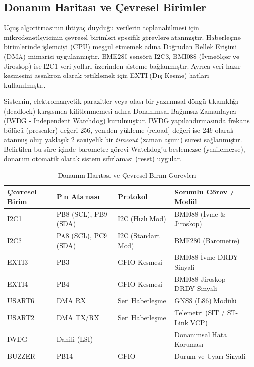 \subsection{Donanım Haritası ve Çevresel Birimler}
\label{donanim_haritasi}

Uçuş algoritmasının ihtiyaç duyduğu verilerin toplanabilmesi için mikrodenetleyicinin çevresel birimleri spesifik görevlere atanmıştır. Haberleşme birimlerinde işlemciyi (CPU) meşgul etmemek adına Doğrudan Bellek Erişimi (DMA) mimarisi uygulanmıştır. BME280 sensörü I2C3, BMI088 (İvmeölçer ve Jiroskop) ise I2C1 veri yolları üzerinden sisteme bağlanmıştır. Ayrıca veri hazır kesmesini asenkron olarak tetiklemek için EXTI (Dış Kesme) hatları kullanılmıştır.

Sistemin, elektromanyetik parazitler veya olası bir yazılımsal döngü tıkanıklığı (deadlock) karşısında kilitlenmemesi adına Donanımsal Bağımsız Zamanlayıcı (IWDG - Independent Watchdog) kurulmuştur. IWDG yapılandırmasında frekans bölücü (prescaler) değeri 256, yeniden yükleme (reload) değeri ise 249 olarak atanmış olup yaklaşık 2 saniyelik bir \textit{timeout} (zaman aşımı) süresi sağlanmıştır. Belirtilen bu süre içinde barometre görevi Watchdog'u beslemezse (yenilemezse), donanım otomatik olarak sistem sıfırlaması (reset) uygular.

\begin{table}[htbp]
    \centering
    \caption{Donanım Haritası ve Çevresel Birim Görevleri}
    \label{tab:donanim_haritasi}
    \begin{tabular}{|l|l|l|l|}
    \hline
    \textbf{Çevresel Birim} & \textbf{Pin Ataması} & \textbf{Protokol} & \textbf{Sorumlu Görev / Modül} \\ \hline
    I2C1 & PB8 (SCL), PB9 (SDA) & I2C (Hızlı Mod) & BMI088 (İvme \& Jiroskop) \\ \hline
    I2C3 & PA8 (SCL), PC9 (SDA) & I2C (Standart Mod) & BME280 (Barometre) \\ \hline
    EXTI3 & PB3 & GPIO Kesmesi & BMI088 İvme DRDY Sinyali \\ \hline
    EXTI4 & PB4 & GPIO Kesmesi & BMI088 Jiroskop DRDY Sinyali \\ \hline
    USART6 & DMA RX & Seri Haberleşme & GNSS (L86) Modülü \\ \hline
    USART2 & DMA TX/RX & Seri Haberleşme & Telemetri (SIT / ST-Link VCP) \\ \hline
    IWDG & Dahili (LSI) & - & Donanımsal Hata Koruması \\ \hline
    BUZZER & PB14 & GPIO & Durum ve Uyarı Sinyali \\ \hline
    \end{tabular}
\end{table}

